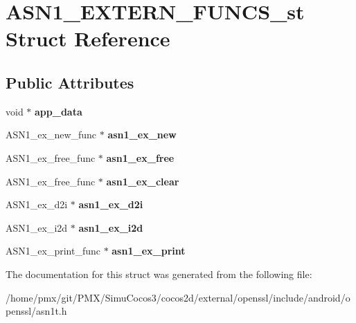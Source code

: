 \hypertarget{structASN1__EXTERN__FUNCS__st}{}\section{A\+S\+N1\+\_\+\+E\+X\+T\+E\+R\+N\+\_\+\+F\+U\+N\+C\+S\+\_\+st Struct Reference}
\label{structASN1__EXTERN__FUNCS__st}
\subsection*{Public Attributes}
\begin{DoxyCompactItemize}
\item 
\mbox{\label{structASN1__EXTERN__FUNCS__st_a7dfc6f80b29e87b87e28aa48f0a5cdb8}} 
void $\ast$ {\bfseries app\+\_\+data}
\item 
\mbox{\label{structASN1__EXTERN__FUNCS__st_ad4527c21fa5aa75d41c973dcc097690e}} 
A\+S\+N1\+\_\+ex\+\_\+new\+\_\+func $\ast$ {\bfseries asn1\+\_\+ex\+\_\+new}
\item 
\mbox{\label{structASN1__EXTERN__FUNCS__st_aafc7ebfda6e57b74449541302b061252}} 
A\+S\+N1\+\_\+ex\+\_\+free\+\_\+func $\ast$ {\bfseries asn1\+\_\+ex\+\_\+free}
\item 
\mbox{\label{structASN1__EXTERN__FUNCS__st_a19ca764d15a9486b76e8817e4ea71644}} 
A\+S\+N1\+\_\+ex\+\_\+free\+\_\+func $\ast$ {\bfseries asn1\+\_\+ex\+\_\+clear}
\item 
\mbox{\label{structASN1__EXTERN__FUNCS__st_a46dcc0e0d7af1e24151eda5d0e7c1a0f}} 
A\+S\+N1\+\_\+ex\+\_\+d2i $\ast$ {\bfseries asn1\+\_\+ex\+\_\+d2i}
\item 
\mbox{\label{structASN1__EXTERN__FUNCS__st_a839a3853e329fef08877ef4375b7be01}} 
A\+S\+N1\+\_\+ex\+\_\+i2d $\ast$ {\bfseries asn1\+\_\+ex\+\_\+i2d}
\item 
\mbox{\label{structASN1__EXTERN__FUNCS__st_aa8ad7588195937c27ae0862253e8d0ef}} 
A\+S\+N1\+\_\+ex\+\_\+print\+\_\+func $\ast$ {\bfseries asn1\+\_\+ex\+\_\+print}
\end{DoxyCompactItemize}


The documentation for this struct was generated from the following file\+:\begin{DoxyCompactItemize}
\item 
/home/pmx/git/\+P\+M\+X/\+Simu\+Cocos3/cocos2d/external/openssl/include/android/openssl/asn1t.\+h\end{DoxyCompactItemize}
